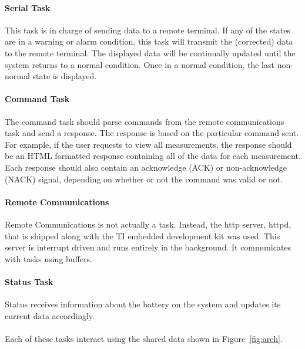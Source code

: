 \documentclass[12pt]{article} %
\begin{document}
    \paragraph{Serial Task} This task is in charge of sending data to
    a remote terminal. If any of the states are in a warning or alarm condition,
		this task will transmit the (corrected) data to the remote terminal. The
		displayed data will be continually updated until the system returns to a
		normal condition. Once in a normal condition, the last non-normal state is
		displayed.

    \paragraph{Command Task} The command task should parse commands from the 
    remote communications task and send a response.  The response is based
    on the particular command sent.  For example, if the user requests to view
    all measurements, the response should be an HTML formatted response
    containing all of the data for each measurement.  Each response should also
    contain an acknowledge (ACK) or non-acknowledge (NACK) signal, depending on whether or not the command was valid or
    not.

    \paragraph{Remote Communications}  Remote Communications is not actually a
    task.  Instead, the http server, httpd, that is shipped along with the TI
    embedded development kit was used.  This server is interrupt driven and
    runs entirely in the background.  It communicates with tasks using buffers.  

    \paragraph{Status Task} Status receives information about the battery on the
    system and updates its current data accordingly.
~\\
~\\
    Each of these tasks interact using the shared data shown in Figure~\ref{fig:arch}. 
\end{document}
